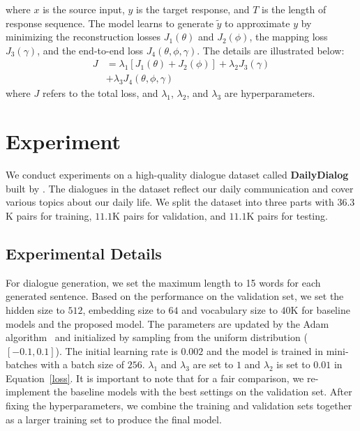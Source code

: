 \documentclass[11pt,a4paper]{article}
\begin{document}
\begin{CJK}{UTF8}{song}
where $x$ is the source input, $y$ is the target response, and $T$ is the length of response sequence.
The model learns to generate $\tilde{y}$ to approximate $y$ by minimizing the reconstruction losses $J_1(\theta)$ and $J_2(\phi)$, the mapping loss $J_3(\gamma)$, and the end-to-end loss $J_4(\theta, \phi, \gamma)$. The details are illustrated below:
\begin{equation}
\begin{split}
J &= \lambda_1\left[J_1(\theta) + J_2(\phi)\right] + \lambda_2J_3(\gamma) \\
&+ \lambda_3J_4(\theta, \phi, \gamma)
\end{split}
\label{loss}
\end{equation}
where $J$ refers to the total loss, and $\lambda_1$, $\lambda_2$, and $\lambda_3$ are hyperparameters.











\section{Experiment}





We conduct experiments on a high-quality dialogue dataset called \textbf{DailyDialog} built by \citet{DBLP:conf/ijcnlp/LiSSLCN17}. The dialogues in the dataset reflect our daily communication and cover various topics about our daily life. We split the dataset into three parts with $36.3$K pairs for training, $11.1$K pairs for validation, and $11.1$K pairs for testing.










\subsection{Experimental Details}

For dialogue generation, we set the maximum length to 15 words for each generated sentence.
Based on the performance on the validation set, we set the hidden size to $512$, embedding size to $64$ and vocabulary size to $40$K for baseline models and the proposed model. The parameters are updated by the Adam algorithm~\cite{DBLP:journals/corr/KingmaB14} and initialized by sampling from the uniform distribution ($[-0.1, 0.1]$). The initial learning rate is $0.002$ and the model is trained in mini-batches with a batch size of $256$. $\lambda_1$ and $\lambda_3$ are set to $1$ and $\lambda_2$ is set to $0.01$ in Equation~\eqref{loss}. It is important to note that for a fair comparison, we re-implement the baseline models with the best settings on the validation set.
After fixing the hyperparameters, we combine the training and validation sets together as a larger training set to produce the final model.







\end{CJK}
\end{document}
